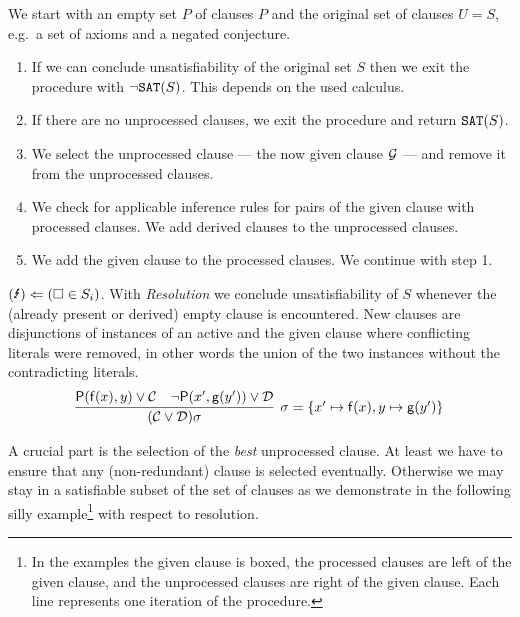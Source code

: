 \begin{procedure}\label{proc:given:clause:algorithm}
	We start with an empty set \( P \) of  clauses \( P \)
	and the original set of  clauses \( U = S \),
	e.g.\ a set of axioms and a negated conjecture.
	\begin{enumerate}
		\item[\jek]
		If we can conclude unsatisfiability of the original set \( S \)
		then we exit the procedure with \( \UNSAT[(S)] \).
		This depends on the used calculus.
		\setcounter{enumi}{0}
		\item If there are no unprocessed clauses,
		we exit the procedure and return \(\SAT[(S)]\).
		\item We select the  unprocessed clause --- the now given clause \( \mcG \) --- and remove it from the unprocessed clauses. \jek{}
		\item We check for applicable inference rules for pairs
		of the given clause with processed clauses.
		We add derived clauses to the unprocessed clauses. \hfill\jek{}
		\item We add the given clause to the processed clauses.
		We continue with step 1.
	\end{enumerate}
\end{procedure}


\begin{remark}
	\((\text{\Lightning}) \Leftarrow (\emptyclause\in S_i) \).
With \emph{Resolution} we conclude unsatisfiability of \( S \) whenever the (already present or derived) empty clause is encountered.
New clauses are disjunctions of instances of an active and the given clause where conflicting literals were removed,
in other words the union of the two instances without the contradicting literals.
\begin{gather*}
\infer[\sigma=\{ x'\mapsto\mf(x), y\mapsto\mg(y') \}]{
	(\mcC \lor \mcD)\sigma
}{
	\mP(\mf(x), y) \lor \mcC & \lnot\mP(x',\mg(y')) \lor \mcD
}
\end{gather*}
\end{remark}

A crucial part is the selection of the \emph{best} unprocessed clause.
At least we have to ensure that any (non-redundant) clause is selected eventually.
Otherwise we may stay in a satisfiable subset of the set of clauses
as we demonstrate in the following silly example\footnote{
In the examples the given clause is boxed,
the processed clauses are left of the given clause,
and the unprocessed clauses are right of the given clause.
Each line represents one iteration of the procedure.
}
with respect to resolution.

